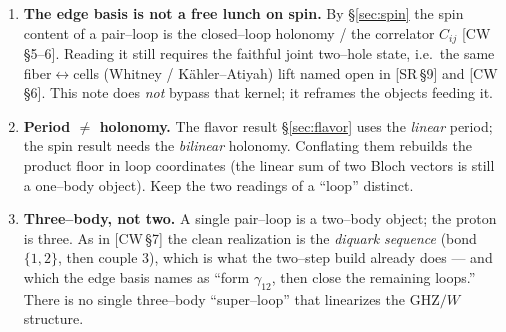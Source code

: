 \documentclass[11pt,oneside]{article}
\theoremstyle{plain}
\begin{document}
\begin{enumerate}[leftmargin=2em]
  \item \textbf{The edge basis is not a free lunch on spin.} By \S\ref{sec:spin}
        the spin content of a pair--loop is the closed--loop holonomy / the
        correlator $C_{ij}$ [CW\,\S5--6]. Reading it still requires the
        faithful joint two--hole state, i.e.\ the same fiber$\leftrightarrow$cells
        (Whitney / K\"ahler--Atiyah) lift named open in [SR\,\S9] and [CW\,\S6].
        This note does \emph{not} bypass that kernel; it reframes the
        objects feeding it.
  \item \textbf{Period $\ne$ holonomy.} The flavor result \S\ref{sec:flavor} uses
        the \emph{linear} period; the spin result needs the \emph{bilinear}
        holonomy. Conflating them rebuilds the product floor in loop coordinates
        (the linear sum of two Bloch vectors is still a one--body object). Keep the
        two readings of a ``loop'' distinct.
  \item \textbf{Three--body, not two.} A single pair--loop is a two--body object;
        the proton is three. As in [CW\,\S7] the clean realization is the
        \emph{diquark sequence} (bond $\{1,2\}$, then couple $3$), which is what
        the two--step build already does --- and which the edge basis names as
        ``form $\gamma_{12}$, then close the remaining loops.'' There is no single
        three--body ``super--loop'' that linearizes the $\mathrm{GHZ}/W$ structure.
\end{enumerate}
\end{document}
